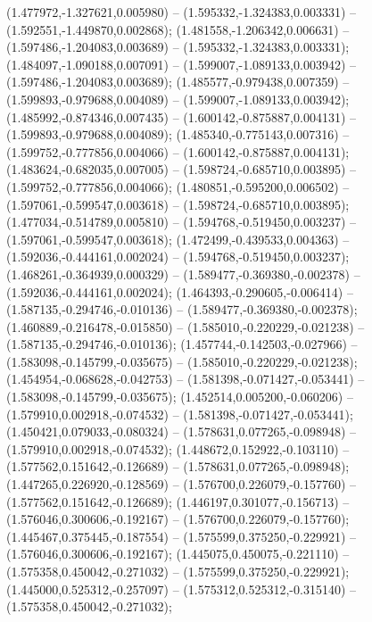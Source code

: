  (1.477972,-1.327621,0.005980) -- (1.595332,-1.324383,0.003331) -- (1.592551,-1.449870,0.002868);
 (1.481558,-1.206342,0.006631) -- (1.597486,-1.204083,0.003689) -- (1.595332,-1.324383,0.003331);
 (1.484097,-1.090188,0.007091) -- (1.599007,-1.089133,0.003942) -- (1.597486,-1.204083,0.003689);
 (1.485577,-0.979438,0.007359) -- (1.599893,-0.979688,0.004089) -- (1.599007,-1.089133,0.003942);
 (1.485992,-0.874346,0.007435) -- (1.600142,-0.875887,0.004131) -- (1.599893,-0.979688,0.004089);
 (1.485340,-0.775143,0.007316) -- (1.599752,-0.777856,0.004066) -- (1.600142,-0.875887,0.004131);
 (1.483624,-0.682035,0.007005) -- (1.598724,-0.685710,0.003895) -- (1.599752,-0.777856,0.004066);
 (1.480851,-0.595200,0.006502) -- (1.597061,-0.599547,0.003618) -- (1.598724,-0.685710,0.003895);
 (1.477034,-0.514789,0.005810) -- (1.594768,-0.519450,0.003237) -- (1.597061,-0.599547,0.003618);
 (1.472499,-0.439533,0.004363) -- (1.592036,-0.444161,0.002024) -- (1.594768,-0.519450,0.003237);
 (1.468261,-0.364939,0.000329) -- (1.589477,-0.369380,-0.002378) -- (1.592036,-0.444161,0.002024);
 (1.464393,-0.290605,-0.006414) -- (1.587135,-0.294746,-0.010136) -- (1.589477,-0.369380,-0.002378);
 (1.460889,-0.216478,-0.015850) -- (1.585010,-0.220229,-0.021238) -- (1.587135,-0.294746,-0.010136);
 (1.457744,-0.142503,-0.027966) -- (1.583098,-0.145799,-0.035675) -- (1.585010,-0.220229,-0.021238);
 (1.454954,-0.068628,-0.042753) -- (1.581398,-0.071427,-0.053441) -- (1.583098,-0.145799,-0.035675);
 (1.452514,0.005200,-0.060206) -- (1.579910,0.002918,-0.074532) -- (1.581398,-0.071427,-0.053441);
 (1.450421,0.079033,-0.080324) -- (1.578631,0.077265,-0.098948) -- (1.579910,0.002918,-0.074532);
 (1.448672,0.152922,-0.103110) -- (1.577562,0.151642,-0.126689) -- (1.578631,0.077265,-0.098948);
 (1.447265,0.226920,-0.128569) -- (1.576700,0.226079,-0.157760) -- (1.577562,0.151642,-0.126689);
 (1.446197,0.301077,-0.156713) -- (1.576046,0.300606,-0.192167) -- (1.576700,0.226079,-0.157760);
 (1.445467,0.375445,-0.187554) -- (1.575599,0.375250,-0.229921) -- (1.576046,0.300606,-0.192167);
 (1.445075,0.450075,-0.221110) -- (1.575358,0.450042,-0.271032) -- (1.575599,0.375250,-0.229921);
 (1.445000,0.525312,-0.257097) -- (1.575312,0.525312,-0.315140) -- (1.575358,0.450042,-0.271032);
